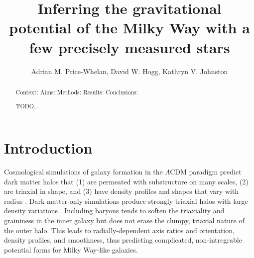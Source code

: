 \documentclass[letterpaper,12pt,preprint]{aastex}
\begin{document}
\title{Inferring the gravitational potential of the Milky Way with a few precisely measured stars}
\author{Adrian M. Price-Whelan, David W. Hogg, Kathryn V. Johnston}

\begin{abstract}
Context:
Aims: 
Methods:
Results:
Conclusions:

TODO...
\end{abstract}


\section{Introduction}

Cosmological simulations of galaxy formation in the $\Lambda$CDM paradigm predict dark matter halos that (1) are permeated with substructure on many scales, (2) are triaxial in shape, and (3) have density profiles and shapes that vary with radius \citep{dubinski91, jing02, kuhlen07, veraciro11}. Dark-matter-only simulations produce strongly triaxial halos \citep{} with large density variations \citep{zemp09}. Including baryons tends to soften the triaxiality and graininess in the inner galaxy \citep[e.g.,][]{dubinski94, pontzen12} but does not erase the clumpy, triaxial nature of the outer halo. This leads to radially-dependent axis ratios and orientation, density profiles, and smoothness, thus predicting complicated, non-intregrable potential forms for Milky Way-like galaxies.
\end{document}
